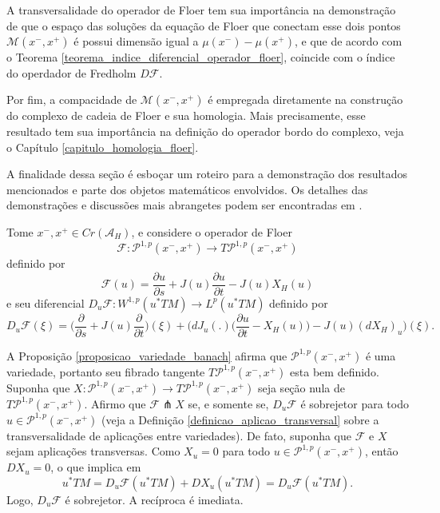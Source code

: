 \documentclass[12pt]{book}
\newcommand{\bigparenteses}[1]{\Big( #1 \Big) }
\newcommand{\caminhosexponenciaisconectantes}[2]{\mathcal{P}^{1,p}(#1, #2)}
\newcommand{\caminhosexponenciaisconectantespadrao}{\caminhosexponenciaisconectantes{x^{-}}{x^{+}}}
\newcommand{\diferencialfloer}{D\operadorFloer}
\newcommand{\diferencialfloerponto}[1]{D_{#1}\operadorFloer}
\newcommand{\derivadaparcial}[2]{\frac{\partial #1}{\partial #2}}
\newcommand{\diferencialhamiltoniano}[1]{(dX_{H})_{#1}}
\newcommand{\energiafinitaM}{\mathcal{M}}
\newcommand{\energiafinitaMconectante}{\energiafinitaM(x^{-}, x^{+})}
\newcommand{\espacoLp}[1]{L^{p}(#1)}
\newcommand{\espacosobolev}[1]{W^{1,p}(#1)}
\newcommand{\funcionalH}{\mathcal{A}_{H}}
\newcommand{\operadorFloer}{\mathcal{F}}
\newcommand{\operadorFloerDefinicao}[1]{\derivadaparcial{#1}{s} + J(#1)\derivadaparcial{#1}{t} - J(#1)X_{H}(#1)}
\newcommand{\operadorFloerParametro}[1]{\mathcal{F}(#1)}
\newcommand{\pontoscriticos}[1]{\textit{Cr}(#1)}
\newcommand{\pullbackfibradotangente}[2]{#1^{*}T#2}
\newcommand{\pullbackfibradotangenteM}[1]{\pullbackfibradotangente{#1}{M}}
\begin{document}
	A transversalidade do operador de Floer tem sua importância na demonstração de que o espaço das soluções da equação de Floer que conectam esse dois pontos $\energiafinitaMconectante$ é possui dimensão igual a $\mu(x^{-})-\mu(x^{+})$, e que de acordo com o Teorema \ref{teorema_indice_diferencial_operador_floer},  coincide com o índice do operdador de Fredholm $\diferencialfloer$.
	
	Por fim, a compacidade de $\energiafinitaMconectante$ é empregada diretamente na construção do complexo de cadeia de Floer e sua homologia. Mais precisamente, esse resultado tem sua importância na definição do operador bordo do complexo, veja o Capítulo \ref{capitulo_homologia_floer}.
	
	A finalidade dessa seção é esboçar um roteiro para a demonstração dos resultados mencionados e parte dos objetos matemáticos envolvidos. Os detalhes das demonstrações e discussões mais abrangetes podem ser encontradas em \cite{audi_floer_homology}.
	
	Tome $x^{-},x^{+}\in \pontoscriticos{\funcionalH}$, e considere o operador de Floer 
	$$
	\operadorFloer: \caminhosexponenciaisconectantespadrao \to T\caminhosexponenciaisconectantespadrao
	$$  
	definido por
	$$
	\operadorFloerParametro{u} =\operadorFloerDefinicao{u}
	$$
	e seu diferencial $\diferencialfloerponto{u}: \espacosobolev{\pullbackfibradotangenteM{u}} \to \espacoLp{\pullbackfibradotangenteM{u}}$ definido por
	$$
	\diferencialfloerponto{u}(\xi)= \Big( \derivadaparcial{}{s} + J(u)\derivadaparcial {}{t}\Big)(\xi)+ \Big(dJ_{u}(.)\bigparenteses{\derivadaparcial{u}{t} - X_{H}(u)} - J(u) \diferencialhamiltoniano{u}\Big)(\xi).
	$$
	
	A Proposição \ref{proposicao_variedade_banach} afirma que $\caminhosexponenciaisconectantespadrao$ é uma variedade, portanto seu fibrado tangente $T\caminhosexponenciaisconectantespadrao$ esta bem definido. Suponha que $X:\caminhosexponenciaisconectantespadrao \to T\caminhosexponenciaisconectantespadrao$ seja seção nula de $T\caminhosexponenciaisconectantespadrao$. Afirmo que $\operadorFloer \pitchfork X$ se, e somente se, $\diferencialfloerponto{u}$ é sobrejetor para todo $u\in \caminhosexponenciaisconectantespadrao$ (veja a Definição \ref{definicao_aplicao_transversal} sobre a transversalidade de aplicações entre variedades). De fato, suponha que $\operadorFloer$ e $X$ sejam aplicações transversas. Como $X_{u} = 0$ para todo $u \in \caminhosexponenciaisconectantespadrao$, então $DX_{u} = 0$, o que implica em
	$$
	\pullbackfibradotangenteM{u}=\diferencialfloerponto{u}(\pullbackfibradotangenteM{u})+DX_{u}(\pullbackfibradotangenteM{u}) = \diferencialfloerponto{u}(\pullbackfibradotangenteM{u}).$$ 
	Logo, $\diferencialfloerponto{u}$ é sobrejetor. A recíproca é imediata.
	
\end{document}
